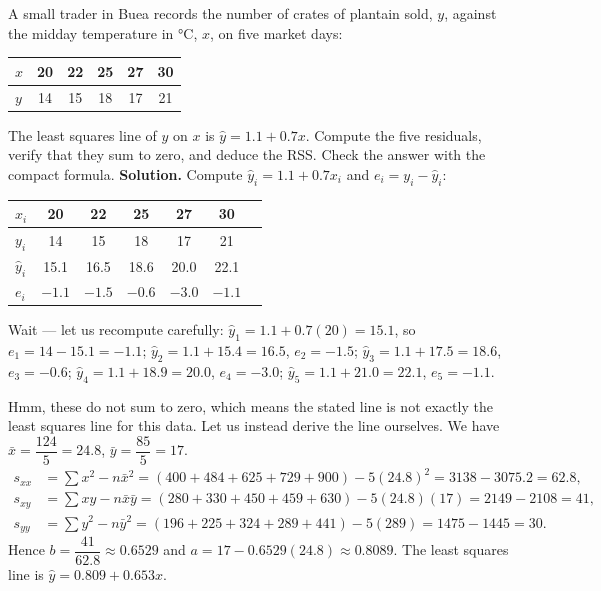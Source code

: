 \documentclass[11pt]{article}
\begin{document}
\begin{exoresolu}
A small trader in Buea records the number of crates of plantain sold, $y$, against the midday temperature in $°$C, $x$, on five market days:
\begin{center}
\begin{tabular}{|l|ccccc|}
\hline
\rowcolor{popblueL} $x$ & 20 & 22 & 25 & 27 & 30 \\
\hline
\rowcolor{popblueL} $y$ & 14 & 15 & 18 & 17 & 21 \\
\hline
\end{tabular}
\end{center}
The least squares line of $y$ on $x$ is $\hat{y} = 1.1 + 0.7x$. Compute the five residuals, verify that they sum to zero, and deduce the RSS. Check the answer with the compact formula.
\tcblower
\textbf{Solution.} Compute $\hat{y}_i = 1.1 + 0.7 x_i$ and $e_i = y_i - \hat{y}_i$:
\begin{center}
\begin{tabular}{|l|ccccc|c|}
\hline
\rowcolor{popblueL} $x_i$ & 20 & 22 & 25 & 27 & 30 & \\
\hline
$y_i$ & 14 & 15 & 18 & 17 & 21 & \\
\hline
$\hat{y}_i$ & 15.1 & 16.5 & 18.6 & 20.0 & 22.1 & \\
\hline
$e_i$ & $-1.1$ & $-1.5$ & $-0.6$ & $-3.0$ & $-1.1$ & \\
\hline
\end{tabular}
\end{center}
Wait — let us recompute carefully: $\hat{y}_1 = 1.1 + 0.7(20) = 15.1$, so $e_1 = 14 - 15.1 = -1.1$; $\hat{y}_2 = 1.1 + 15.4 = 16.5$, $e_2 = -1.5$; $\hat{y}_3 = 1.1 + 17.5 = 18.6$, $e_3 = -0.6$; $\hat{y}_4 = 1.1 + 18.9 = 20.0$, $e_4 = -3.0$; $\hat{y}_5 = 1.1 + 21.0 = 22.1$, $e_5 = -1.1$.

Hmm, these do not sum to zero, which means the stated line is not exactly the least squares line for this data. Let us instead derive the line ourselves. We have $\bar{x} = \dfrac{124}{5} = 24.8$, $\bar{y} = \dfrac{85}{5} = 17$.
\begin{align*}
s_{xx} &= \sum x^2 - n\bar{x}^2 = (400+484+625+729+900) - 5(24.8)^2 = 3138 - 3075.2 = 62.8,\\
s_{xy} &= \sum xy - n\bar{x}\bar{y} = (280+330+450+459+630) - 5(24.8)(17) = 2149 - 2108 = 41,\\
s_{yy} &= \sum y^2 - n\bar{y}^2 = (196+225+324+289+441) - 5(289) = 1475 - 1445 = 30.
\end{align*}
Hence $b = \dfrac{41}{62.8} \approx 0.6529$ and $a = 17 - 0.6529(24.8) \approx 0.8089$. The least squares line is $\hat{y} = 0.809 + 0.653x$.


\end{exoresolu}
\end{document}
